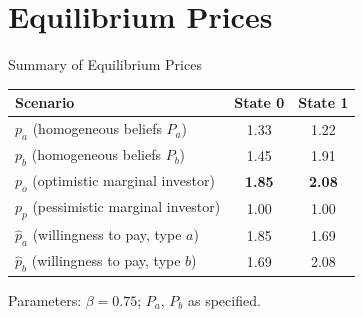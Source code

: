 \documentclass[aspectratio=169]{beamer}
\newcommand{\pha}{\hat{p}_a}
\newcommand{\phb}{\hat{p}_b}
\newcommand{\Pa}{P_a}
\newcommand{\Pb}{P_b}
\begin{document}
\section{Equilibrium Prices}

\begin{frame}{Summary of Equilibrium Prices}
  \begin{center}
  \renewcommand{\arraystretch}{1.4}
  \begin{tabular}{lcc}
    \toprule
    \textbf{Scenario} & \textbf{State 0} & \textbf{State 1} \\
    \midrule
    $p_a$ \;(homogeneous beliefs $\Pa$) & 1.33 & 1.22 \\
    $p_b$ \;(homogeneous beliefs $\Pb$) & 1.45 & 1.91 \\
    \midrule
    $p_o$ \;(optimistic marginal investor) & \textbf{1.85} & \textbf{2.08} \\
    $p_p$ \;(pessimistic marginal investor) & 1.00 & 1.00 \\
    \midrule
    $\pha$ \;(willingness to pay, type $a$) & 1.85 & 1.69 \\
    $\phb$ \;(willingness to pay, type $b$) & 1.69 & 2.08 \\
    \bottomrule
  \end{tabular}
  \end{center}

  \bigskip
  \footnotesize Parameters: $\beta = 0.75$; $P_a$, $P_b$ as specified.
\end{frame}
\end{document}
